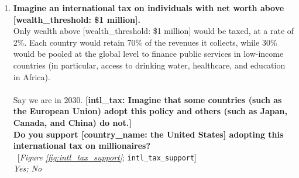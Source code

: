\begin{enumerate}[resume]
\item  \label{q:intl_tax_support} \textbf{Imagine an international tax on individuals with net worth above [wealth\_threshold: \$1 million].~}\\Only wealth above [wealth\_threshold: \$1 million] would be taxed, at a rate of 2\%. Each country would retain 70\% of the revenues it collects, while 30\% would be pooled at the global level to finance public services in low-income countries (in particular, access to drinking water, healthcare, and education in Africa). \\\\Say we are in 2030.\textbf{ [intl\_tax: Imagine that some countries  (such as the European Union) adopt this policy and others (such as Japan, Canada, and China) do not.]\\Do you support [country\_name: the United States] adopting this international tax on millionaires?}\\ 
~[\textit{Figure \ref{fig:intl_tax_support}}; 
\verb|intl_tax_support|]
  \\ \textit{Yes; No}

\end{enumerate} 

